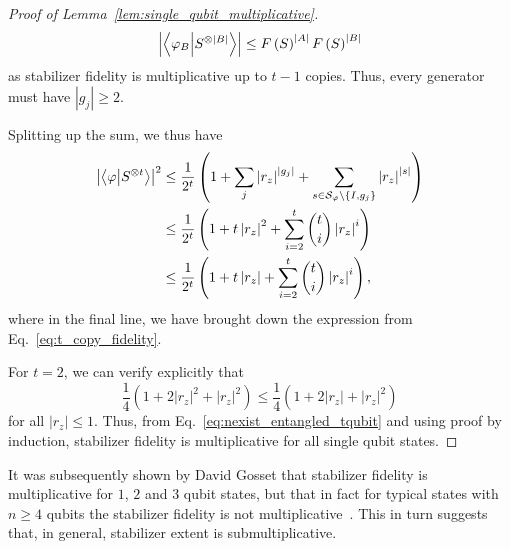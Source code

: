 \begin{proof}[Proof of Lemma~\ref{lem:single_qubit_multiplicative}]
\[\left|\braket{\varphi_{B}}{S^{\otimes \left|B\right|}}\right| \leq F\left(S\right)^{\left|A\right|}F\left(S\right)^{\left|B\right|}\]
as stabilizer fidelity is multiplicative up to $t-1$ copies. Thus, every generator must have $\left|g_{j}\right| \geq 2$.\par
Splitting up the sum, we thus have
\begin{align}
\left|\braket{\varphi}{S^{\otimes t}}\right|^{2} &\leq \frac{1}{2^{t}} \left(1 + \sum_{j}\left|r_{z}\right|^{\left|g_{j}\right|} + \sum_{s \in \mathcal{S}_{\varphi}\setminus \{I, g_{j}\}}\left|r_{z}\right|^{\left|s\right|}\right) \nonumber \\
& \leq \frac{1}{2^{t}}\left(1+t\left|r_{z}\right|^{2} + \sum_{i=2}^{t}\binom{t}{i}\left|r_{z}\right|^{i}\right) \nonumber \\
&\leq \frac{1}{2^{t}} \left( 1+t\left|r_{z}\right| + \sum_{i=2}^{t}\binom{t}{i}\left|r_{z}\right|^{i} \right),
\label{eq:nexist_entangled_tqubit}
\end{align}
where in the final line, we have brought down the expression from Eq.~\ref{eq:t_copy_fidelity}.\par
For $t=2$, we can verify explicitly that 
\[\frac{1}{4}\left(1+2\left|r_{z}\right|^{2} + \left|r_{z}\right|^{2}\right) \leq \frac{1}{4}\left(1+2\left|r_{z}\right|+ \left|r_{z}\right|^{2}\right)\]
for all $\left|r_{z}\right|\leq 1$. Thus, from Eq.~\ref{eq:nexist_entangled_tqubit} and using proof by induction, stabilizer fidelity is multiplicative for all single qubit states.
\end{proof}
It was subsequently shown by David Gosset that stabilizer fidelity is multiplicative for $1$, $2$ and $3$ qubit states, but that in fact for typical states with $n\geq 4$ qubits the stabilizer fidelity is not multiplicative~\cite{Bravyi2018}. This in turn suggests that, in general, stabilizer extent is submultiplicative.

